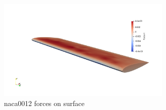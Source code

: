 \begin{figure}[htbp!]
	\centering
	\includegraphics[width=0.75\textwidth]{images/heathcote/naca0012_Fy.png}
	\caption{naca0012 forces on surface}
	\label{fig:hc-iterations}
\end{figure}
